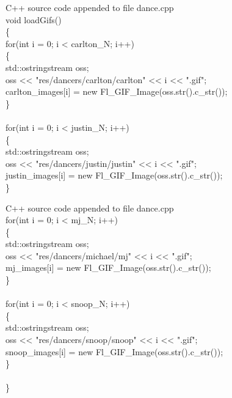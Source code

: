 \documentclass {article}
\begin{document}
\begin{GFT}{C++ source code appended to file dance.cpp}
\+\\
\+void loadGifs()\\
\+\{\\
\+     for(int i = 0; i < carlton\_N; i++)\\
\+     \{\\
\+       std::ostringstream oss;\\
\+       oss << "res/dancers/carlton/carlton" << i << ".gif";\\
\+       carlton\_images[i] = new Fl\_GIF\_Image(oss.str().c\_str());\\
\+     \}\\
\+\\
\+     for(int i = 0; i < justin\_N; i++)\\
\+     \{\\
\+       std::ostringstream oss;\\
\+       oss << "res/dancers/justin/justin" << i << ".gif";\\
\+       justin\_images[i] = new Fl\_GIF\_Image(oss.str().c\_str());\\
\+     \}\\
\end{GFT}
\clearpage
\begin{GFT}{C++ source code appended to file dance.cpp}
\+\\
\+     for(int i = 0; i < mj\_N; i++)\\
\+     \{\\
\+       std::ostringstream oss;\\
\+       oss << "res/dancers/michael/mj" << i << ".gif";\\
\+       mj\_images[i] = new Fl\_GIF\_Image(oss.str().c\_str());\\
\+     \}\\
\+\\
\+     for(int i = 0; i < snoop\_N; i++)\\
\+     \{\\
\+       std::ostringstream oss;\\
\+       oss << "res/dancers/snoop/snoop" << i << ".gif";\\
\+       snoop\_images[i] = new Fl\_GIF\_Image(oss.str().c\_str());\\
\+     \}\\
\+ \\
\+\}\\
\end{GFT}
\clearpage
\end{document}
